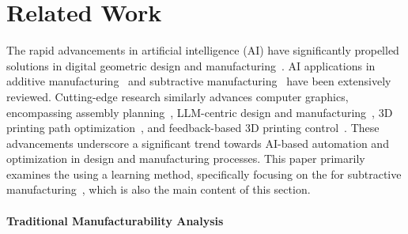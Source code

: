\section{Related Work}
\label{sec:related}

 

The rapid advancements in artificial intelligence (AI) have significantly propelled solutions in digital geometric design and manufacturing~\cite{abdelaal2024ai}. 
AI applications in additive manufacturing~\cite{wang2020smart, zhang2024machine} and subtractive manufacturing~\cite{manikanta2024machine, soori2023machine} have been extensively reviewed.
Cutting-edge research similarly advances computer graphics, encompassing assembly planning~\cite{jones2021automate}, LLM-centric design and manufacturing~\cite{makatura2024can1,makatura2024can2}, 3D printing path optimization~\cite{huang2024learning, liu2024neural}, and feedback-based 3D printing control~\cite{piovarci2022closed}.
%
These advancements underscore a significant trend towards AI-based automation and optimization in design and manufacturing processes.
This paper primarily examines the \manuAna using a learning method, specifically focusing on the \accessAna for subtractive manufacturing~\cite{gupta1997automated, hoefer2017automated}, which is also the main content of this section.



\paragraph{Traditional Manufacturability Analysis}


